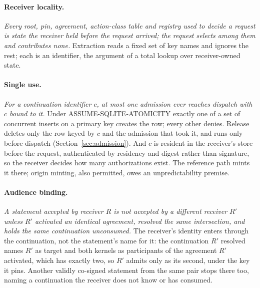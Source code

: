 \paragraph{Receiver locality.}
\emph{Every root, pin, agreement, action-class table and registry used to decide
a request is state the receiver held before the request arrived; the request
selects among them and contributes none.}
Extraction reads a fixed set of key names and ignores the rest; each is an
identifier, the argument of a total lookup over receiver-owned state.

\paragraph{Single use.}
\emph{For a continuation identifier $c$, at most one admission ever reaches
dispatch with $c$ bound to it.}
Under ASSUME-SQLITE-ATOMICITY exactly one of a set of concurrent inserts on a
primary key creates the row; every other denies. Release deletes only the row
keyed by $c$ and the admission that took it, and runs only before dispatch
(Section~\ref{sec:admission}). And $c$ is resident in the receiver's store
before the request, authenticated by residency and digest rather than signature,
so the receiver decides how many authorizations exist. The reference
path mints it there; origin minting, also permitted, owes an
unpredictability premise.

\paragraph{Audience binding.}
\emph{A statement accepted by receiver $R$ is not accepted by a different
receiver $R'$ unless $R'$ activated an identical agreement, resolved the same
intersection, and holds the same continuation unconsumed.}
The receiver's identity enters through the continuation, not the statement's
name for it: the continuation $R'$ resolved names $R'$ as target and both
kernels as participants of the agreement $R'$ activated, which has exactly two,
so $R'$ admits only as its second, under the key it pins. Another
validly co-signed statement from the same pair stops there too, naming a
continuation the receiver does not know or has consumed.

